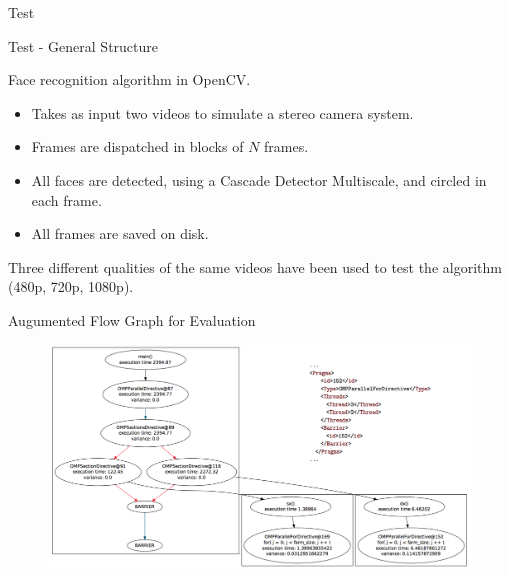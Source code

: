 \documentclass[xcolor=dvipsnames]{beamer}
\begin{document}
\begin{section}{Test}











\begin{frame}{\hskip 0.3cm Test - General Structure}

Face recognition algorithm in OpenCV.

\begin{itemize}

\item Takes as input two videos to simulate a stereo camera system.

\item Frames are dispatched in blocks of $N$ frames.
 
\item All faces are detected, using a Cascade Detector Multiscale, and circled in each frame.

\item All frames are saved on disk.


\end{itemize}

Three different qualities of the same videos have been used to test the algorithm (480p, 720p, 1080p).


\end{frame}
















\begin{frame}{\hskip 0.3cm Augumented Flow Graph for Evaluation}

\vskip -1cm

\begin{figure}
\hskip -1cm

\includegraphics[scale=0.25]{test.png}
\end{figure}


\end{frame}
\end{section}
\end{document}
